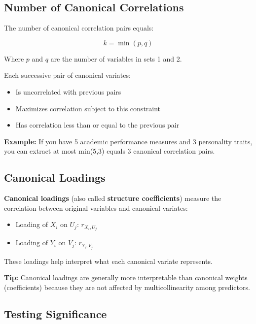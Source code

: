 \documentclass[
]{article}
\begin{document}
\textbf{ }

\subsection{Number of Canonical Correlations}

The number of canonical correlation pairs equals:

\[k = \min(p,q)\]

Where \(p\) and \(q\) are the number of variables in sets 1 and 2.

Each successive pair of canonical variates:

\begin{itemize}
\item
  Is uncorrelated with previous pairs
\item
  Maximizes correlation subject to this constraint
\item
  Has correlation less than or equal to the previous pair
\end{itemize}

\textbf{Example: } If you have 5 academic performance measures and 3
personality traits, you can extract at most min(5,3) equals 3 canonical
correlation pairs.

\textbf{ }

\subsection{Canonical Loadings}

\textbf{Canonical loadings} (also called \textbf{structure
coefficients}) measure the correlation between original variables and
canonical variates:

\begin{itemize}
\item
  Loading of \(X_{i}\) on \(U_{j}\): \(r_{X_{i},U_{j}}\)
\item
  Loading of \(Y_{i}\) on \(V_{j}\): \(r_{Y_{i},V_{j}}\)
\end{itemize}

These loadings help interpret what each canonical variate represents.

\textbf{Tip: } Canonical loadings are generally more interpretable than
canonical weights (coefficients) because they are not affected by
multicollinearity among predictors.

\textbf{ }

\subsection{Testing Significance}
\end{document}
